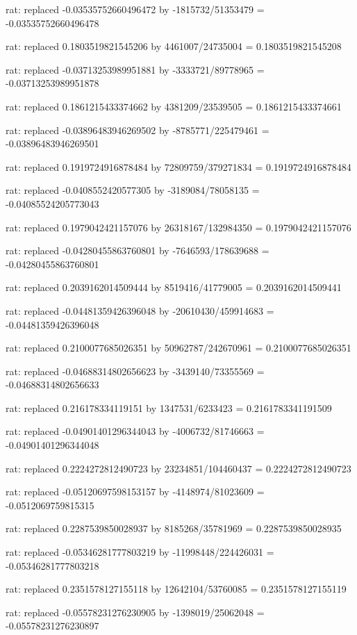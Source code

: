 \documentclass[a4paper,10pt]{article}
\begin{document}
\begin{eulernotebook}
\begin{eulercomment}
\begin{eulercomment}
\begin{eulercomment}
\begin{eulercomment}
\begin{eulercomment}
\begin{eulercomment}
\begin{eulercomment}
\begin{eulercomment}
\begin{eulercomment}
\begin{eulercomment}
\begin{eulercomment}
\begin{eulercomment}
\begin{eulercomment}
\begin{eulercomment}
\begin{eulercomment}
\begin{eulercomment}
\begin{euleroutput}
  rat: replaced -0.03535752660496472 by -1815732/51353479 = -0.03535752660496478
  
  rat: replaced 0.1803519821545206 by 4461007/24735004 = 0.1803519821545208
  
  rat: replaced -0.03713253989951881 by -3333721/89778965 = -0.03713253989951878
  
  rat: replaced 0.1861215433374662 by 4381209/23539505 = 0.1861215433374661
  
  rat: replaced -0.03896483946269502 by -8785771/225479461 = -0.03896483946269501
  
  rat: replaced 0.1919724916878484 by 72809759/379271834 = 0.1919724916878484
  
  rat: replaced -0.0408552420577305 by -3189084/78058135 = -0.04085524205773043
  
  rat: replaced 0.1979042421157076 by 26318167/132984350 = 0.1979042421157076
  
  rat: replaced -0.04280455863760801 by -7646593/178639688 = -0.04280455863760801
  
  rat: replaced 0.2039162014509444 by 8519416/41779005 = 0.2039162014509441
  
  rat: replaced -0.04481359426396048 by -20610430/459914683 = -0.04481359426396048
  
  rat: replaced 0.2100077685026351 by 50962787/242670961 = 0.2100077685026351
  
  rat: replaced -0.04688314802656623 by -3439140/73355569 = -0.04688314802656633
  
  rat: replaced 0.216178334119151 by 1347531/6233423 = 0.2161783341191509
  
  rat: replaced -0.04901401296344043 by -4006732/81746663 = -0.04901401296344048
  
  rat: replaced 0.2224272812490723 by 23234851/104460437 = 0.2224272812490723
  
  rat: replaced -0.05120697598153157 by -4148974/81023609 = -0.0512069759815315
  
  rat: replaced 0.2287539850028937 by 8185268/35781969 = 0.2287539850028935
  
  rat: replaced -0.05346281777803219 by -11998448/224426031 = -0.05346281777803218
  
  rat: replaced 0.2351578127155118 by 12642104/53760085 = 0.2351578127155119
  
  rat: replaced -0.05578231276230905 by -1398019/25062048 = -0.05578231276230897
  

\end{euleroutput}
\end{eulercomment}
\end{eulercomment}
\end{eulercomment}
\end{eulercomment}
\end{eulercomment}
\end{eulercomment}
\end{eulercomment}
\end{eulercomment}
\end{eulercomment}
\end{eulercomment}
\end{eulercomment}
\end{eulercomment}
\end{eulercomment}
\end{eulercomment}
\end{eulercomment}
\end{eulercomment}
\end{eulernotebook}
\end{document}
